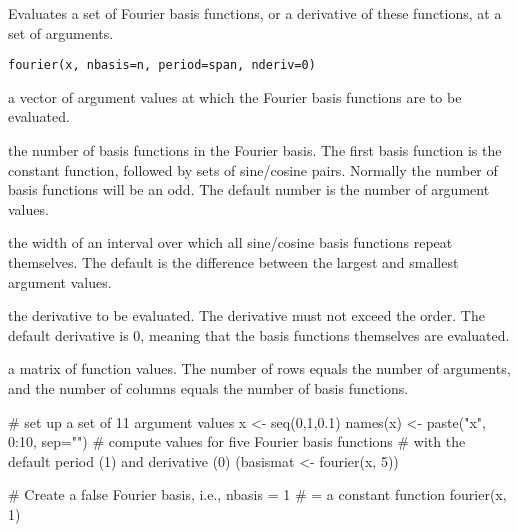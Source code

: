 \begin{Description}\relax
Evaluates a set of Fourier basis functions, or a derivative of these
functions, at a set of arguments.
\end{Description}
\begin{Usage}
\begin{verbatim}
fourier(x, nbasis=n, period=span, nderiv=0)
\end{verbatim}
\end{Usage}
\begin{Arguments}
\begin{ldescription}
\item[\code{x}] a vector of argument values at which the Fourier basis functions are
to be evaluated.

\item[\code{nbasis}] the number of basis functions in the Fourier basis.  The first basis
function is the constant function, followed by sets of  sine/cosine
pairs.  Normally the number of basis functions will be an odd.  The
default number is the number of argument values.

\item[\code{period}] the width of an interval over which all sine/cosine basis functions
repeat themselves. The default is the difference between the largest
and smallest argument values.

\item[\code{nderiv}] the derivative to be evaluated.  The derivative must not exceed the
order.  The default derivative is 0, meaning that the basis functions
themselves are evaluated.

\end{ldescription}
\end{Arguments}
\begin{Value}
a matrix of function values.  The number of rows equals the number of
arguments, and the number of columns equals the number of basis functions.
\end{Value}
\begin{SeeAlso}\relax
{}
\end{SeeAlso}
\begin{Examples}
\begin{ExampleCode}

#  set up a set of 11 argument values
x <- seq(0,1,0.1)
names(x) <- paste("x", 0:10, sep="")
#  compute values for five Fourier basis functions
#  with the default period (1) and derivative (0)
(basismat <- fourier(x, 5))

# Create a false Fourier basis, i.e., nbasis = 1
# = a constant function
fourier(x, 1)

\end{ExampleCode}
\end{Examples}


